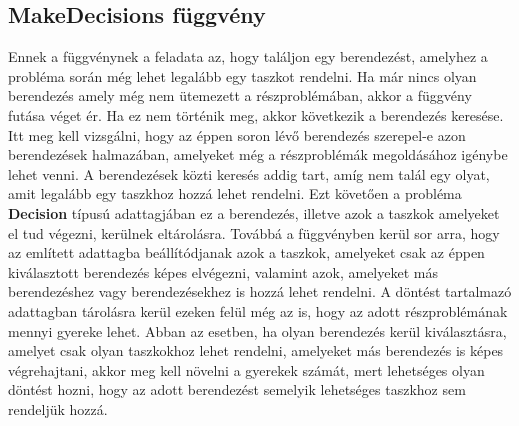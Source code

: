 \subsection{MakeDecisions függvény}
Ennek a függvénynek a feladata az, hogy találjon egy berendezést, amelyhez a probléma során még lehet legalább egy taszkot rendelni. Ha már nincs olyan berendezés amely még nem ütemezett a részproblémában, akkor a függvény futása véget ér. Ha ez nem történik meg, akkor következik a berendezés keresése. Itt meg kell vizsgálni, hogy az éppen soron lévő berendezés szerepel-e azon berendezések halmazában, amelyeket még a részproblémák megoldásához igénybe lehet venni. A berendezések közti keresés addig tart, amíg nem talál egy olyat, amit legalább egy taszkhoz hozzá lehet rendelni. Ezt követően a probléma \textbf{Decision} típusú adattagjában ez a berendezés, illetve azok a taszkok amelyeket el tud végezni, kerülnek eltárolásra. Továbbá a függvényben kerül sor arra, hogy az említett adattagba beállítódjanak azok a taszkok, amelyeket csak az éppen kiválasztott berendezés képes elvégezni, valamint azok, amelyeket más berendezéshez vagy berendezésekhez is hozzá lehet rendelni. A döntést tartalmazó adattagban tárolásra kerül ezeken felül még az is, hogy az adott részproblémának mennyi gyereke lehet. Abban az esetben, ha olyan berendezés kerül kiválasztásra, amelyet csak olyan taszkokhoz lehet rendelni, amelyeket más berendezés is képes végrehajtani, akkor meg kell növelni a gyerekek számát, mert lehetséges olyan döntést hozni, hogy az adott berendezést semelyik lehetséges taszkhoz sem rendeljük hozzá.   
